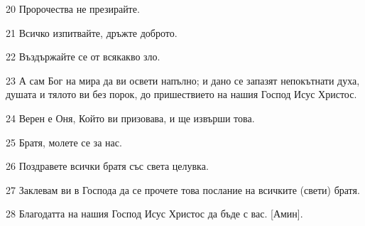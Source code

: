 \par 20 Пророчества не презирайте.
\par 21 Всичко изпитвайте, дръжте доброто.
\par 22 Въздържайте се от всякакво зло.
\par 23 А сам Бог на мира да ви освети напълно; и дано се запазят непокътнати духа, душата и тялото ви без порок, до пришествието на нашия Господ Исус Христос.
\par 24 Верен е Оня, Който ви призовава, и ще извърши това.
\par 25 Братя, молете се за нас.
\par 26 Поздравете всички братя със света целувка.
\par 27 Заклевам ви в Господа да се прочете това послание на всичките (свети) братя.
\par 28 Благодатта на нашия Господ Исус Христос да бъде с вас. [Амин].

